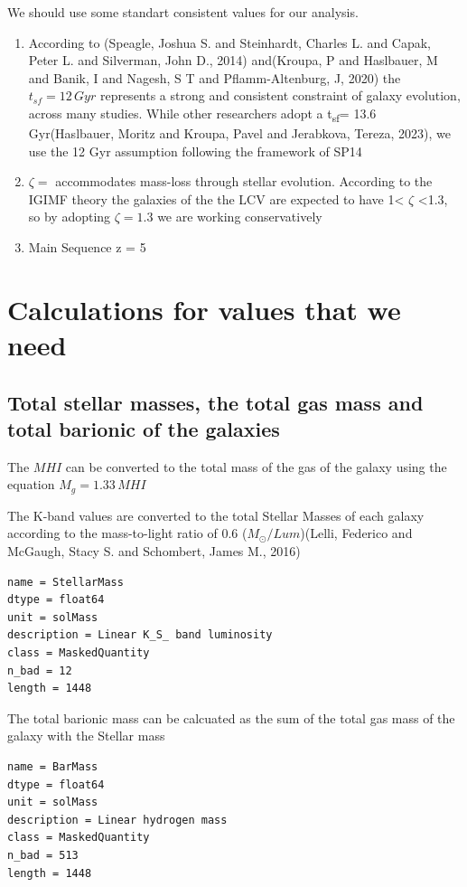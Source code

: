 \documentclass[a4paper]{article}
\begin{document}
We should use some standart consistent values for our analysis.

\begin{enumerate}
\item According to (Speagle, Joshua S. and Steinhardt, Charles L. and Capak, Peter L. and Silverman, John D., 2014) and(Kroupa, P and Haslbauer, M and Banik, I and Nagesh, S T and Pflamm-Altenburg, J, 2020) the \(t_{sf} = 12\, Gyr\) represents a strong and consistent constraint of galaxy evolution, across many studies. While other researchers adopt a t\textsubscript{sf}= 13.6 Gyr(Haslbauer, Moritz and Kroupa, Pavel and Jerabkova, Tereza, 2023), we use the 12 Gyr assumption following the framework of SP14
\item \(\zeta =\) accommodates mass-loss through stellar evolution. According to the IGIMF theory the galaxies of the the LCV are expected to have 1< \(\zeta\) <1.3, so by adopting \(\zeta =1.3\) we are working conservatively
\item Main Sequence z = 5
\end{enumerate}

\section{Calculations for values that we need}
\label{sec:orgea354e0}


\subsection{Total stellar masses, the total gas mass and total barionic of the galaxies}
\label{sec:orgf921de0}

The \(MHI\) can be converted to the total mass of the gas of the galaxy using the equation \(M_g=1.33\, MHI\)


The K-band values are converted to the total Stellar Masses of each galaxy according to the mass-to-light ratio of 0.6 (\(M_\odot/Lum\))(Lelli, Federico and McGaugh, Stacy S. and Schombert, James M., 2016)

\begin{verbatim}
name = StellarMass
dtype = float64
unit = solMass
description = Linear K_S_ band luminosity
class = MaskedQuantity
n_bad = 12
length = 1448
\end{verbatim}


The total barionic mass can be calcuated as the sum of the total gas mass of the galaxy with the Stellar mass

\begin{verbatim}
name = BarMass
dtype = float64
unit = solMass
description = Linear hydrogen mass
class = MaskedQuantity
n_bad = 513
length = 1448
\end{verbatim}
\end{document}
